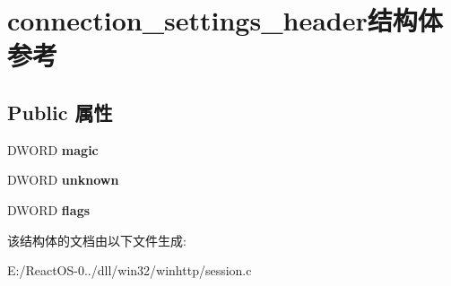 \hypertarget{structconnection__settings__header}{}\section{connection\+\_\+settings\+\_\+header结构体 参考}
\label{structconnection__settings__header}
\subsection*{Public 属性}
\begin{DoxyCompactItemize}
\item 
\mbox{\label{structconnection__settings__header_ac12b829e927319c4c0933b4ebf681d80}} 
D\+W\+O\+RD {\bfseries magic}
\item 
\mbox{\label{structconnection__settings__header_ade524759287c965b50523419babce281}} 
D\+W\+O\+RD {\bfseries unknown}
\item 
\mbox{\label{structconnection__settings__header_a5896c6dd86197d47a64ef07ef44efd40}} 
D\+W\+O\+RD {\bfseries flags}
\end{DoxyCompactItemize}


该结构体的文档由以下文件生成\+:\begin{DoxyCompactItemize}
\item 
E\+:/\+React\+O\+S-\/0../dll/win32/winhttp/session.\+c\end{DoxyCompactItemize}
